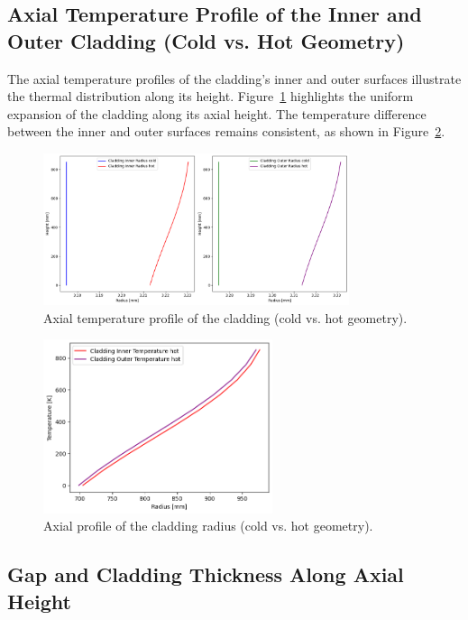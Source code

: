 \subsection{Axial Temperature Profile of the Inner and Outer Cladding (Cold vs. Hot Geometry)}

The axial temperature profiles of the cladding’s inner and outer surfaces illustrate the thermal distribution along its height. Figure~\ref{fig:Cladding_InOut_Temperature_Hot} highlights the uniform expansion of the cladding along its axial height. The temperature difference between the inner and outer surfaces remains consistent, as shown in Figure~\ref{fig:Cladding_Radius_ColdHot}.

\begin{figure}[H]
\centering
\includegraphics[width=0.8\textwidth]{2_cladding_in_out_coldhot.png}
\caption{Axial temperature profile of the cladding (cold vs. hot geometry).}
\label{fig:Cladding_InOut_Temperature_Hot}
\end{figure}

\begin{figure}[H]
\centering
\includegraphics[width=0.6\textwidth]{3_clad_inout_diff.png}
\caption{Axial profile of the cladding radius (cold vs. hot geometry).}
\label{fig:Cladding_Radius_ColdHot}
\end{figure}

\subsection{Gap and Cladding Thickness Along Axial Height}


